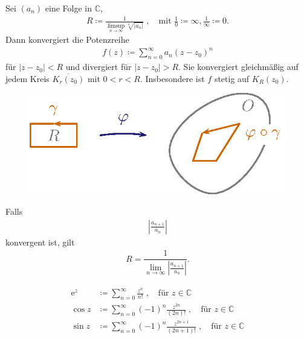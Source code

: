 \documentclass[a4paper,10pt]{scrbook}
\begin{document}
\begin{theorem}[Potenzreihen]
  Sei $(a_n)$ eine Folge in $\mathbb{C}$,
  \begin{align*}
    R \coloneq \frac{1}{\limsup\limits_{n \to \infty} \sqrt[n]{|a_n|}} \; , \quad \text{mit } \frac{1}{0} \coloneq \infty, \frac{1}{\infty} \coloneq 0.
  \end{align*}
  Dann konvergiert die Potenzreihe
  \begin{align*}
    f(z) \coloneq \sum\limits_{n=0}^{\infty} a_n (z-z_0)^n
  \end{align*}
  für $|z - z_0| < R$ und divergiert für $|z - z_0| > R$. Sie konvergiert gleichmäßig auf jedem Kreis $\overline{K_r(z_0)}$ mit $0 < r < R$. Insbesondere ist $f$ stetig auf $K_R(z_0)$.

  \begin{figure}[H]
    \centering
    \includegraphics[scale=0.2]{images/ana3-tmp-4}
    \vspace*{-2em}
  \end{figure}
  Falls
  \begin{align*}
    \left| \frac{a_{n+1}}{a_n} \right|
  \end{align*}
  konvergent ist, gilt
  \begin{align*}
    R = \dfrac{1}{\lim_{n\to \infty} \left| \frac{a_{n+1}}{a_n} \right|}.
  \end{align*}
\end{theorem}

\begin{theorem}[Definition]
  \begin{align*}
    \mathrm{e}^z &\coloneq \sum\limits_{n=0}^{\infty} \frac{z^n}{n!} \; , \quad \text{für } z \in \mathbb{C} \\
    \cos z &\coloneq \sum\limits_{n=0}^{\infty} (-1)^n \frac{z^{2n}}{(2n)!} \; , \quad \text{für } z \in \mathbb{C} \\
    \sin z &\coloneq \sum\limits_{n=0}^{\infty} (-1)^n \frac{z^{2n + 1}}{(2n + 1)!} \; , \quad \text{für } z \in \mathbb{C}
  \end{align*}
\end{theorem}
\end{document}
